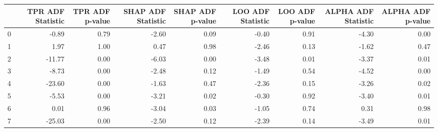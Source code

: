 \begin{tabular}{lrrrrrrrr}
\toprule
 & TPR ADF Statistic & TPR ADF p-value & SHAP ADF Statistic & SHAP ADF p-value & LOO ADF Statistic & LOO ADF p-value & ALPHA ADF Statistic & ALPHA ADF p-value \\
\midrule
0 & -0.89 & 0.79 & -2.60 & 0.09 & -0.40 & 0.91 & -4.30 & 0.00 \\
1 & 1.97 & 1.00 & 0.47 & 0.98 & -2.46 & 0.13 & -1.62 & 0.47 \\
2 & -11.77 & 0.00 & -6.03 & 0.00 & -3.48 & 0.01 & -3.37 & 0.01 \\
3 & -8.73 & 0.00 & -2.48 & 0.12 & -1.49 & 0.54 & -4.52 & 0.00 \\
4 & -23.60 & 0.00 & -1.63 & 0.47 & -2.36 & 0.15 & -3.26 & 0.02 \\
5 & -5.53 & 0.00 & -3.21 & 0.02 & -0.30 & 0.92 & -3.40 & 0.01 \\
6 & 0.01 & 0.96 & -3.04 & 0.03 & -1.05 & 0.74 & 0.31 & 0.98 \\
7 & -25.03 & 0.00 & -2.50 & 0.12 & -2.39 & 0.14 & -3.49 & 0.01 \\
\bottomrule
\end{tabular}
